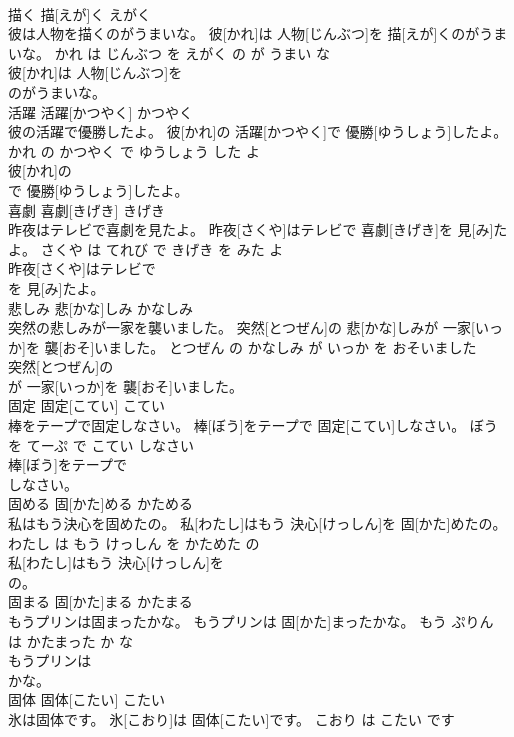 \documentclass[8pt]{extreport}
\begin{document}
\begin{CJK}{UTF8}{min}
\\	描く	描[えが]く	えがく	
\\	彼は人物を描くのがうまいな。	彼[かれ]は 人物[じんぶつ]を 描[えが]くのがうまいな。	かれ は じんぶつ を えがく の が うまい な	
\\	彼[かれ]は 人物[じんぶつ]を
\\	のがうまいな。			
\\	活躍	活躍[かつやく]	かつやく	
\\	彼の活躍で優勝したよ。	彼[かれ]の 活躍[かつやく]で 優勝[ゆうしょう]したよ。	かれ の かつやく で ゆうしょう した よ	
\\	彼[かれ]の
\\	で 優勝[ゆうしょう]したよ。			
\\	喜劇	喜劇[きげき]	きげき	
\\	昨夜はテレビで喜劇を見たよ。	昨夜[さくや]はテレビで 喜劇[きげき]を 見[み]たよ。	さくや は てれび で きげき を みた よ	
\\	昨夜[さくや]はテレビで
\\	を 見[み]たよ。			
\\	悲しみ	悲[かな]しみ	かなしみ	
\\	突然の悲しみが一家を襲いました。	突然[とつぜん]の 悲[かな]しみが 一家[いっか]を 襲[おそ]いました。	とつぜん の かなしみ が いっか を おそいました	
\\	突然[とつぜん]の
\\	が 一家[いっか]を 襲[おそ]いました。			
\\	固定	固定[こてい]	こてい	
\\	棒をテープで固定しなさい。	棒[ぼう]をテープで 固定[こてい]しなさい。	ぼう を てーぷ で こてい しなさい	
\\	棒[ぼう]をテープで
\\	しなさい。			
\\	固める	固[かた]める	かためる	
\\	私はもう決心を固めたの。	私[わたし]はもう 決心[けっしん]を 固[かた]めたの。	わたし は もう けっしん を かためた の	
\\	私[わたし]はもう 決心[けっしん]を
\\	の。			
\\	固まる	固[かた]まる	かたまる	
\\	もうプリンは固まったかな。	もうプリンは 固[かた]まったかな。	もう ぷりん は かたまった か な	
\\	もうプリンは
\\	かな。			
\\	固体	固体[こたい]	こたい	
\\	氷は固体です。	氷[こおり]は 固体[こたい]です。	こおり は こたい です	

\end{CJK}
\end{document}
